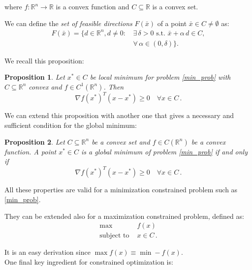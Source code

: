 \documentclass[10pt,twocolumn,letterpaper, english]{article}
\theoremstyle{definition}
\theoremstyle{plain}
\theoremstyle{plain}
\theoremstyle{plain}
\theoremstyle{plain}
\newtheorem{prop}{Proposition}[subsection]
\theoremstyle{remark}
\theoremstyle{remark}
\theoremstyle{definition}
\theoremstyle{definition}
\theoremstyle{definition}
\theoremstyle{definition}
\begin{document}
\noindent where $f: \mathbb{R}^n \to \mathbb{R}$ is a convex function and $C \subseteq \mathbb{R}$ is a convex set.

We can define the \textit{set of feasible directions} $F(\bar{x})$ of a point $\bar{x} \in C \ne \emptyset$ as: 
\begin{align}
    F(\bar{x}) = \{ d \in \mathbb{R}^n, d \ne 0:\, &\exists \, \delta > 0 \text{ s.t. } \bar{x} + \alpha\, d \in C, \\ &\forall\, \alpha \in (0, \delta) \} . \nonumber
\end{align}

\noindent We recall this proposition: 

\begin{prop}
 Let $x^* \in C$ be local minimum for problem \ref{min_prob} with $C \subseteq \mathbb{R}^n$ convex and $f \in C^1(\mathbb{R}^n)$. Then 
\begin{equation}
    \label{ineq}
    \nabla f(x^*)^T (x - x^*) \ge 0 \quad \forall x \in C \,. 
\end{equation}

\end{prop}


We can extend this proposition with another one that gives a necessary and sufficient condition for the global minimum: 

\begin{prop}
Let $C \subseteq \mathbb{R}^n$ be a convex set and $f \in C(\mathbb{R}^n)$ be a convex function. A point $x^* \in C$ is a \textit{global minimum} of problem \ref{min_prob} if and only if 
\begin{equation*}
    \nabla f(x^*)^T (x - x^*) \ge 0 \quad \forall x \in C \,. 
\end{equation*}
\end{prop}

All these properties are valid for a minimization constrained problem such as \ref{min_prob}. 

They can be extended also for a maximization constrained problem, defined as: 
\begin{align*}
    \max\, &f(x) \\
    \text{subject to } &x \in C \,.
\end{align*}

It is an easy derivation since $\max f(x) \equiv \min -f(x)$. \\

One final key ingredient for constrained optimization is:\\
\end{document}
